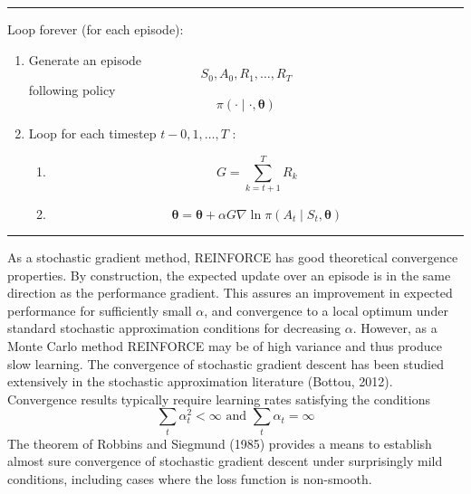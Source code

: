 \documentclass[11pt]{article}
\theoremstyle{plain} %
\theoremstyle{remark}
\begin{document}
  \vspace*{0.65em}
  \hrule
  
  Loop forever (for each episode):
              \begin{enumerate}[label=(\arabic*)]
                \item Generate an episode
                $$
                S_{0}, A_{0}, R_{1}, \ldots, R_{T}
                $$
                following policy
                $$
                \pi(\cdot \mid \cdot, \boldsymbol{\theta})
                $$
                \item Loop for each timestep $t-0,1, \ldots, T$ :
                  \begin{enumerate}[label=(\arabic*)]
                    \item $$
                    G=\sum_{k=t+1}^{T} R_{k}
                    $$
                    \item $$
                    \boldsymbol{\theta}=\boldsymbol{\theta}+\alpha G \nabla \ln \pi\left(A_{t} \mid S_{t}, \boldsymbol{\theta}\right)
                    $$
                  \end{enumerate}
                \end{enumerate}
  
  \vspace*{0.65em}
  \hrule

As a stochastic gradient method, REINFORCE has good theoretical
  convergence properties. By construction, the expected update over an episode is in the same
  direction as the performance gradient. This assures an improvement in expected performance for sufficiently
  small $\alpha$, and convergence to a local optimum under standard stochastic
  approximation conditions for decreasing $\alpha$. However, as a Monte Carlo method REINFORCE may be of high variance and
  thus produce slow learning. The convergence of stochastic gradient descent has been studied
  extensively in the stochastic approximation literature (Bottou, 2012). Convergence results typically require learning rates satisfying the
  conditions
$$
\sum_{t} \alpha_{t}^{2}<\infty \text { and } \sum_{t} \alpha_{t}=\infty
$$
The theorem of Robbins and Siegmund (1985) provides a means to establish
  almost sure convergence of stochastic gradient descent under surprisingly mild
  conditions, including cases where the loss function is non-smooth.
\end{document}
